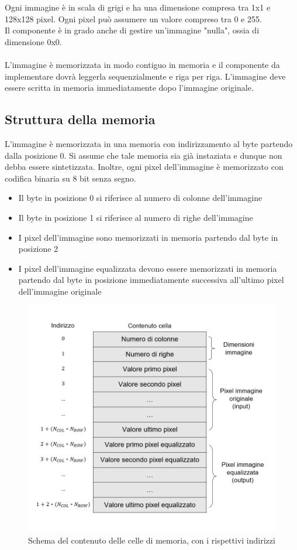 \documentclass[a4paper, 12pt]{article}
\begin{document}
\bigskip\noindent
Ogni immagine è in scala di grigi e ha una dimensione compresa tra 1x1 e 128x128 pixel. Ogni pixel può assumere un valore compreso tra 0 e 255. \\
Il componente è in grado anche di gestire un'immagine "nulla", ossia di dimensione 0x0.
\\\\
L'immagine è memorizzata in modo contiguo in memoria e il componente da implementare dovrà leggerla sequenzialmente e riga per riga. L'immagine deve essere scritta in memoria immediatamente dopo l'immagine originale.

\subsection{Struttura della memoria}
L'immagine è memorizzata in una memoria con indirizzamento al byte partendo dalla posizione 0.
Si assume che tale memoria sia già instaziata e dunque non debba essere sintetizzata.
Inoltre, ogni pixel dell'immagine è memorizzato con codifica binaria su 8 bit senza segno.
\begin{itemize}
    \item Il byte in posizione 0 si riferisce al numero di colonne dell'immagine
    \item Il byte in posizione 1 si riferisce al numero di righe dell'immagine
    \item I pixel dell'immagine sono memorizzati in memoria partendo dal byte in posizione 2
    \item I pixel dell'immagine equalizzata devono essere memorizzati in memoria partendo dal byte in posizione immediatamente successiva all'ultimo pixel dell'immagine originale
\end{itemize}

\begin{figure}[h]
    \centering
    \includegraphics[scale=0.90]{memory_scheme.png}
    \caption{Schema del contenuto delle celle di memoria, con i rispettivi indirizzi}
    \label{fig:memory_scheme}
\end{figure}
\end{document}
